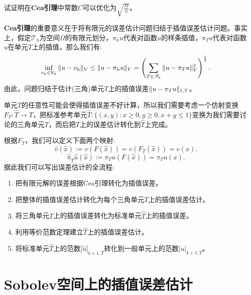 \begin{exercise}
    试证明在\textbf{Cea引理}中常数$C$可以优化为$\sqrt{\frac{M}{\alpha}}$。
\end{exercise}
\begin{remark}
    \textbf{Cea引理}的重要意义在于将有限元的误差估计问题归结于插值误差估计问题。事实上，假定$\mathscr{T}_{h}$为空间$\Omega$的有限元划分，$\pi_{h}u$代表对函数$u$的样条插值，$\pi_{T}u$代表对函数$u$在单元$T$上的插值，那么我们有:
    \begin{equation}
        \label{eq:errorapprox}
        \inf_{v_{h}\in V_{h}}\|u-v_{h}\|_{V}\le\|u-\pi_{h}u\|_{V}=\left(\sum_{T\in\mathscr{T}_{h}}\|u-\pi_{T}u\|_{V}^{2}\right)^{\frac{1}{2}}.
    \end{equation}
    由此，问题归结于估计(三角)单元$T$上的插值误差$\|u-\pi_{T}u\|_{1,T}$。
\end{remark}
单元$T$的任意性可能会使得插值误差不好计算，所以我们需要考虑一个仿射变换$F_{T}:\hat{T}\rightarrow T$，把标准参考单元$\hat{T}:\{(x,y):x\ge 0,y\ge 0,x+y\le 1\}$变换为我们需要讨论的三角单元$T$，而后把$T$上的误差估计转化到$\hat{T}$上完成。

根据$F_{T}$，我们可以定义下面两个映射:
\begin{equation}
    \hat{v}(\hat{x}):=v(F(\hat{x}))=v(F_{T}(\hat{x}))=v(x).
\end{equation}
\begin{equation}
    \hat{\pi}_{\hat{T}}\hat{u}(\hat{x}):=\pi_{T}u(F(\hat{x}))=\pi_{T}u(x).
\end{equation}
据此我们可以写出误差估计的全流程:
\begin{enumerate}
    \item 把有限元解的误差根据Cea引理转化为插值误差。
    \item 把整体的插值误差估计转化为每个三角单元$T$上的插值误差估计。
    \item 将三角单元$T$上的插值误差转化为标准单元$\hat{T}$上的插值误差。
    \item 利用等价范数定理建立$\hat{T}$上的插值误差估计。
    \item 将标准单元$\hat{T}$上的范数$|\hat{u}|_{k+1,\hat{T}}$转化到一般单元上的范数$|u|_{k+1,T}$。
\end{enumerate}
\section{Sobolev空间上的插值误差估计}
